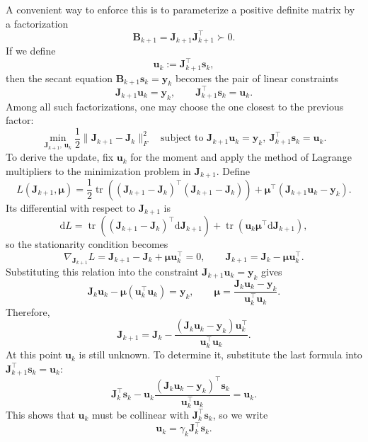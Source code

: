 A convenient way to enforce this is to parameterize a positive definite matrix
by a factorization
\[
  \mathbf{B}_{k+1}=\mathbf{J}_{k+1}\mathbf{J}_{k+1}^{\top}\succ 0.
\]
If we define
\[
  \mathbf{u}_k:=\mathbf{J}_{k+1}^{\top}\mathbf{s}_k,
\]
then the secant equation $\mathbf{B}_{k+1}\mathbf{s}_k=\mathbf{y}_k$ becomes
the pair of linear constraints
\[
  \mathbf{J}_{k+1}\mathbf{u}_k=\mathbf{y}_k,
  \qquad
  \mathbf{J}_{k+1}^{\top}\mathbf{s}_k=\mathbf{u}_k.
\]
Among all such factorizations, one may choose the one closest to the previous
factor:
\[
  \min_{\mathbf{J}_{k+1},\,\mathbf{u}_k}
  \frac12 \|\mathbf{J}_{k+1}-\mathbf{J}_k\|_F^2
  \quad
  \text{subject to }
  \mathbf{J}_{k+1}\mathbf{u}_k=\mathbf{y}_k,
  \ \mathbf{J}_{k+1}^{\top}\mathbf{s}_k=\mathbf{u}_k.
\]
To derive the update, fix $\mathbf{u}_k$ for the moment and apply the method of
Lagrange multipliers to the minimization problem in $\mathbf{J}_{k+1}$. Define
\[
  L(\mathbf{J}_{k+1},\boldsymbol{\mu})
  =
  \frac12 \operatorname{tr}\!\left(
    (\mathbf{J}_{k+1}-\mathbf{J}_k)^\top
    (\mathbf{J}_{k+1}-\mathbf{J}_k)
  \right)
  +
  \boldsymbol{\mu}^\top(\mathbf{J}_{k+1}\mathbf{u}_k-\mathbf{y}_k).
\]
Its differential with respect to $\mathbf{J}_{k+1}$ is
\[
  \mathrm{d}L
  =
  \operatorname{tr}\!\left(
    (\mathbf{J}_{k+1}-\mathbf{J}_k)^\top \mathrm{d}\mathbf{J}_{k+1}
  \right)
  +
  \operatorname{tr}\!\left(
    \mathbf{u}_k\boldsymbol{\mu}^\top \mathrm{d}\mathbf{J}_{k+1}
  \right),
\]
so the stationarity condition becomes
\[
  \nabla_{\mathbf{J}_{k+1}}L
  =
  \mathbf{J}_{k+1}-\mathbf{J}_k+\boldsymbol{\mu}\mathbf{u}_k^\top
  =0,
  \qquad
  \mathbf{J}_{k+1}
  =
  \mathbf{J}_k-\boldsymbol{\mu}\mathbf{u}_k^\top.
\]
Substituting this relation into the constraint
$\mathbf{J}_{k+1}\mathbf{u}_k=\mathbf{y}_k$ gives
\[
  \mathbf{J}_k\mathbf{u}_k-\boldsymbol{\mu}(\mathbf{u}_k^\top\mathbf{u}_k)
  =\mathbf{y}_k,
  \qquad
  \boldsymbol{\mu}
  =
  \frac{\mathbf{J}_k\mathbf{u}_k-\mathbf{y}_k}
  {\mathbf{u}_k^\top\mathbf{u}_k}.
\]
Therefore,
\[
  \mathbf{J}_{k+1}
  =
  \mathbf{J}_k
  -\frac{(\mathbf{J}_k\mathbf{u}_k-\mathbf{y}_k)\mathbf{u}_k^\top}
  {\mathbf{u}_k^\top\mathbf{u}_k}.
\]
At this point $\mathbf{u}_k$ is still unknown. To determine it, substitute the
last formula into $\mathbf{J}_{k+1}^{\top}\mathbf{s}_k=\mathbf{u}_k$:
\[
  \mathbf{J}_k^\top\mathbf{s}_k
  -\mathbf{u}_k
  \frac{(\mathbf{J}_k\mathbf{u}_k-\mathbf{y}_k)^\top \mathbf{s}_k}
  {\mathbf{u}_k^\top\mathbf{u}_k}
  =
  \mathbf{u}_k.
\]
This shows that $\mathbf{u}_k$ must be collinear with
$\mathbf{J}_k^\top\mathbf{s}_k$, so we write
\[
  \mathbf{u}_k=\gamma_k \mathbf{J}_k^\top\mathbf{s}_k.
\]
